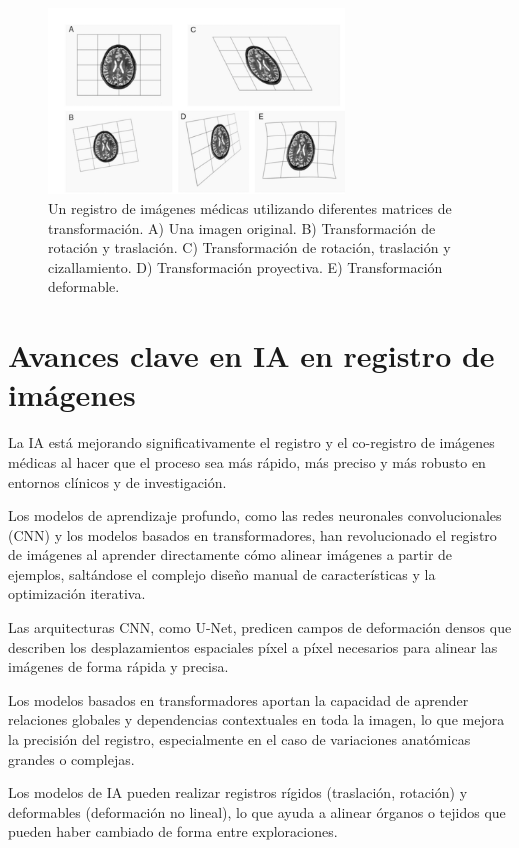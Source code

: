 \begin{figure}[h]
\centering
\includegraphics[width = 0.7\textwidth]{figs/registration-medical.png}
\caption{Un registro de imágenes médicas utilizando diferentes matrices de transformación. A) Una imagen original. B) Transformación de rotación y traslación. C) Transformación de rotación, traslación y cizallamiento. D) Transformación proyectiva. E) Transformación deformable.}
\end{figure}

\section{Avances clave en IA en registro de imágenes}
La IA está mejorando significativamente el registro y el co-registro de imágenes médicas al hacer que el proceso sea más rápido, más preciso y más robusto en entornos clínicos y de investigación.

Los modelos de aprendizaje profundo, como las redes neuronales convolucionales (CNN) y los modelos basados en transformadores, han revolucionado el registro de imágenes al aprender directamente cómo alinear imágenes a partir de ejemplos, saltándose el complejo diseño manual de características y la optimización iterativa.

Las arquitecturas CNN, como U-Net, predicen campos de deformación densos que describen los desplazamientos espaciales píxel a píxel necesarios para alinear las imágenes de forma rápida y precisa.

Los modelos basados en transformadores aportan la capacidad de aprender relaciones globales y dependencias contextuales en toda la imagen, lo que mejora la precisión del registro, especialmente en el caso de variaciones anatómicas grandes o complejas.

Los modelos de IA pueden realizar registros rígidos (traslación, rotación) y deformables (deformación no lineal), lo que ayuda a alinear órganos o tejidos que pueden haber cambiado de forma entre exploraciones.
 
